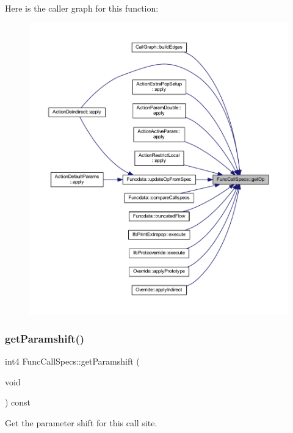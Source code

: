 Here is the caller graph for this function\+:
\nopagebreak
\begin{figure}[H]
\begin{center}
\leavevmode
\includegraphics[width=350pt]{class_func_call_specs_ad88ee3058ece9a8b19f4e25566c03121_icgraph}
\end{center}
\end{figure}
\mbox{\label{class_func_call_specs_adc330a0897cbe51cd961095d77d7a6f0}} 
\subsubsection{\texorpdfstring{getParamshift()}{getParamshift()}}
{\footnotesize\ttfamily int4 Func\+Call\+Specs\+::get\+Paramshift (\begin{DoxyParamCaption}\item[{void}]{ }\end{DoxyParamCaption}) const\hspace{0.3cm}{\ttfamily [inline]}}



Get the parameter shift for this call site. 




